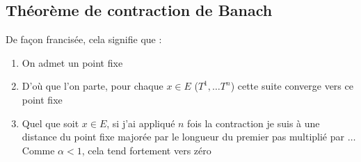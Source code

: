 	\subsection{Théorème de contraction de Banach}
	\newpage
	De façon francisée, cela signifie que :
	\begin{enumerate}
	\item On admet un point fixe
	\item D’où que l'on parte, pour chaque $x \in E$ ($T^1, \dots T^n$) cette suite
	converge vers ce point fixe
	\item Quel que soit $x \in E$, si j'ai appliqué $n$ fois la contraction je suis 
	à une distance du point fixe majorée par le longueur du premier pas multiplié par
	$\dots$ Comme $\alpha < 1$, cela tend fortement vers zéro
	\end{enumerate}
	
